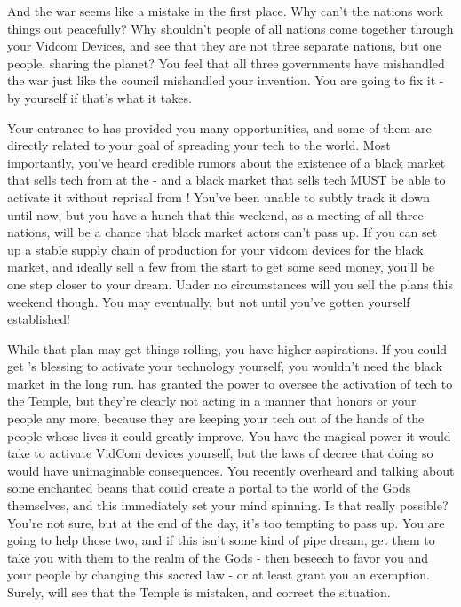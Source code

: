 \documentclass[char]{GL2020}
\begin{document}
And the war seems like a mistake in the first place. Why can’t the nations work things out peacefully? Why shouldn’t people of all nations come together through your Vidcom Devices, and see that they are not three separate nations, but one people, sharing the planet? You feel that all three governments have mishandled the war just like the council mishandled your invention. You are going to fix it - by yourself if that’s what it takes.

Your entrance to \pSchool{} has provided you many opportunities, and some of them are directly related to your goal of spreading your tech to the world. Most importantly, you’ve heard credible rumors about the existence of a black market that sells tech from \pTech{} at the \pSc{} - and a black market that sells tech MUST be able to activate it without reprisal from \cTechGod{}! You’ve been unable to subtly track it down until now, but you have a hunch that this weekend, as a meeting of all three nations, will be a chance that black market actors can’t pass up. If you can set up a stable supply chain of production for your vidcom devices for the black market, and ideally sell a few from the start to get some seed money, you’ll be one step closer to your dream. Under no circumstances will you sell the plans this weekend though. You may eventually, but not until you’ve gotten yourself established!

While that plan may get things rolling, you have higher aspirations. If you could get \cTechGod{}’s blessing to activate your technology yourself, you wouldn’t need the black market in the long run. \cTechGod{} has granted the power to oversee the activation of tech to the Temple, but they’re clearly not acting in a manner that honors \cTechGod{} or your people any more, because they are keeping your tech out of the hands of the people whose lives it could greatly improve. You have the magical power it would take to activate VidCom devices yourself, but the laws of \cTechGod{} decree that doing so would have unimaginable consequences. You recently overheard \cFlowPriest{} and \cCurse{} talking about some enchanted beans that could create a portal to the world of the Gods themselves, and this immediately set your mind spinning. Is that really possible? You’re not sure, but at the end of the day, it’s too tempting to pass up. You are going to help those two, and if this isn’t some kind of pipe dream, get them to take you with them to the realm of the Gods - then beseech \cTechGod{} to favor you and your people by changing this sacred law - or at least grant you an exemption. Surely, \cTechGod{} will see that the Temple is mistaken, and correct the situation.
\end{document}
